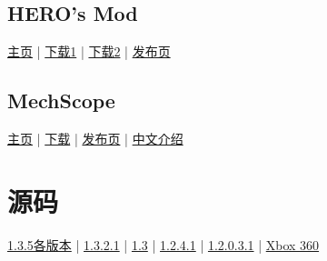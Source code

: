 \subsection{HERO's Mod}\label{app6}
\href{https://github.com/JavidPack/HEROsMod}{主页} | \href{http://javid.ddns.net/tModLoader/download.php?Down=mods/HEROsMod.tmod}{下载1} | \href{https://github.com/JavidPack/HEROsMod/releases}{下载2} | \href{https://forums.terraria.org/index.php?threads/heros-mod-creative-mode-server-management-and-over-25-tools-1-3-4-4-compatible.44650/}{发布页}

\subsection{MechScope}\label{app7}
\href{https://github.com/DRKV333/MechScope}{主页} | \href{https://github.com/DRKV333/MechScope/releases/}{下载} | \href{https://forums.terraria.org/index.php?threads/mechscope-wiring-visualized.70665/}{发布页} | \href{https://www.bilibili.com/read/cv2222687}{中文介绍}

\section{源码}\label{app8}
\href{https://github.com/Pryaxis/Sources}{1.3.5各版本} | \href{https://github.com/NoviaDroid/TerrariaRefractoring_1.3.2.1}{1.3.2.1} | \href{https://github.com/saniainf/EDTerraria}{1.3} | \href{https://github.com/EdgeKiller/terrariaSource}{1.2.4.1} | \href{https://github.com/TheVamp/Terraria-Source-Code}{1.2.0.3.1} | \href{https://github.com/dptug/TerrariaXDK}{Xbox 360}


